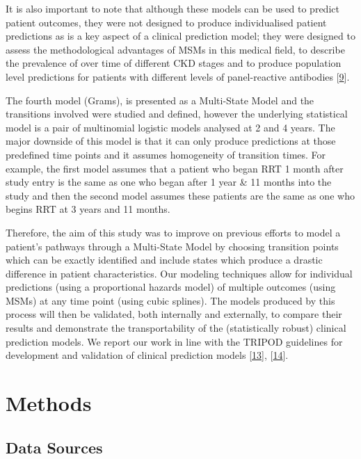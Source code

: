 \documentclass[12pt,PhD,twoside,openright]{muthesis}
\begin{document}
It is also important to note that although these models can be used to predict patient outcomes, they were not designed to produce individualised patient predictions as is a key aspect of a clinical prediction model; they were designed to assess the methodological advantages of MSMs in this medical field, to describe the prevalence of over time of different CKD stages and to produce population level predictions for patients with different levels of panel-reactive antibodies {[}\protect\hyperlink{ref-royston_prognosis_2009}{9}{]}.

The fourth model (Grams), is presented as a Multi-State Model and the transitions involved were studied and defined, however the underlying statistical model is a pair of multinomial logistic models analysed at 2 and 4 years. The major downside of this model is that it can only produce predictions at those predefined time points and it assumes homogeneity of transition times. For example, the first model assumes that a patient who began RRT 1 month after study entry is the same as one who began after 1 year \& 11 months into the study and then the second model assumes these patients are the same as one who begins RRT at 3 years and 11 months.

Therefore, the aim of this study was to improve on previous efforts to model a patient's pathways through a Multi-State Model by choosing transition points which can be exactly identified and include states which produce a drastic difference in patient characteristics. Our modeling techniques allow for individual predictions (using a proportional hazards model) of multiple outcomes (using MSMs) at any time point (using cubic splines). The models produced by this process will then be validated, both internally and externally, to compare their results and demonstrate the transportability of the (statistically robust) clinical prediction models. We report our work in line with the TRIPOD guidelines for development and validation of clinical prediction models {[}\protect\hyperlink{ref-collins_transparent_2015}{13}{]}, {[}\protect\hyperlink{ref-moons_transparent_2015}{14}{]}.

\hypertarget{methods-5}{%
\section{Methods}\label{methods-5}}

\hypertarget{data-sources}{%
\subsection{Data Sources}\label{data-sources}}
\end{document}
